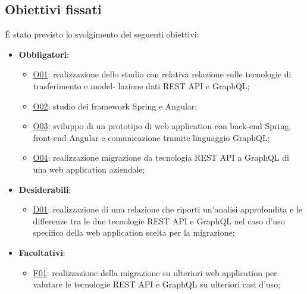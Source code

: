 \subsection*{Obiettivi fissati}
É stato previsto lo svolgimento dei seguenti obiettivi:
\begin{itemize}
  \item \textbf{Obbligatori}:
  \begin{itemize}
    \item \underline{O01}: realizzazione dello studio con relativa relazione sulle tecnologie di trasferimento e model- lazione dati REST API e GraphQL;
    \item \underline{O02}: studio dei framework Spring e Angular;
    \item \underline{O03}: sviluppo di un prototipo di web application con back-end Spring, front-end Angular e
comunicazione tramite linguaggio GraphQL;
    \item \underline{O04}: realizzazione migrazione da tecnologia REST API a GraphQL di una web application aziendale;
  \end{itemize}
  \item \textbf{Desiderabili}:
  \begin{itemize}
    \item \underline{D01}: realizzazione di una relazione che riporti un’analisi approfondita e le differenze tra le due tecnologie REST API e GraphQL nel caso d’uso specifico della web application scelta per la migrazione;
  \end{itemize}
  \item \textbf{Facoltativi}:
  \begin{itemize}
    \item \underline{F01}: realizzazione della migrazione su ulteriori web application per valutare le tecnologie REST API e GraphQL su ulteriori casi d’uso;
  \end{itemize}
\end{itemize}
